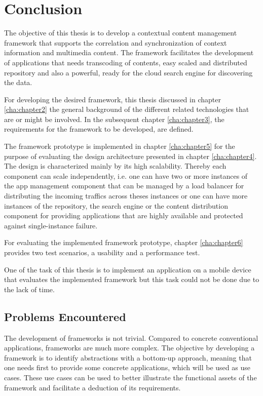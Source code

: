 \chapter{Conclusion\label{cha:chapter7}}
The objective of this thesis is to develop a contextual content management framework that supports the correlation and synchronization of context information and multimedia content. The framework facilitates the development of applications that needs transcoding of contents, easy scaled and distributed repository and also a powerful, ready for the cloud search engine for discovering the data. 

For developing the desired framework, this thesis discussed in chapter \ref{cha:chapter2} the general background of the different related technologies that are or might be involved. In the subsequent chapter \ref{cha:chapter3}, the requirements for the framework to be developed, are defined.

The framework prototype is implemented in chapter \ref{cha:chapter5} for the purpose of evaluating the design architecture presented in chapter \ref{cha:chapter4}. The design is characterized mainly by its high scalability. Thereby each component can scale independently, i.e. one can have two or more instances of the app management component that can be managed by a load balancer for distributing the incoming traffics across theses instances or one can have more instances of the repository, the search engine or the content distribution component for providing applications that are highly available and protected against single-instance failure.

For evaluating the implemented framework prototype, chapter \ref{cha:chapter6} provides two test scenarios, a usability and a performance test.

One of the task of this thesis is to implement an application on a mobile device that evaluates the implemented framework but this task could not be done due to the lack of time.
 
\section{Problems Encountered}
The development of frameworks is not trivial. Compared to concrete conventional applications, frameworks are much more complex. The objective by developing a framework is to identify abstractions with a bottom-up approach, meaning that one needs first to provide some concrete applications, which will be used as use cases. These use cases can be used to better illustrate the functional assets of the framework and facilitate a deduction of its requirements.

